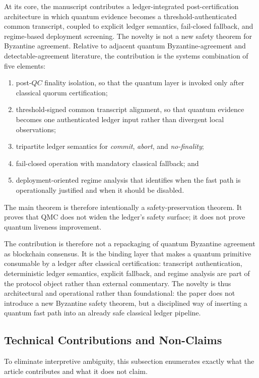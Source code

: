\documentclass{ieeeaccess}
\begin{document}
At its core, the manuscript contributes a ledger-integrated post-certification architecture in which quantum evidence becomes a threshold-authenticated common transcript, coupled to explicit ledger semantics, fail-closed fallback, and regime-based deployment screening. The novelty is not a new safety theorem for Byzantine agreement. Relative to adjacent quantum Byzantine-agreement and detectable-agreement literature, the contribution is the systems combination of five elements:
\begin{enumerate}
    \item post-$QC$ finality isolation, so that the quantum layer is invoked only after classical quorum certification;
    \item threshold-signed common transcript alignment, so that quantum evidence becomes one authenticated ledger input rather than divergent local observations;
    \item tripartite ledger semantics for \textit{commit}, \textit{abort}, and \textit{no-finality};
    \item fail-closed operation with mandatory classical fallback; and
    \item deployment-oriented regime analysis that identifies when the fast path is operationally justified and when it should be disabled.
\end{enumerate}
The main theorem is therefore intentionally a safety-preservation theorem. It proves that QMC does not widen the ledger's safety surface; it does not prove quantum liveness improvement.

The contribution is therefore not a repackaging of quantum Byzantine agreement as blockchain consensus. It is the binding layer that makes a quantum primitive consumable by a ledger after classical certification: transcript authentication, deterministic ledger semantics, explicit fallback, and regime analysis are part of the protocol object rather than external commentary. The novelty is thus architectural and operational rather than foundational: the paper does not introduce a new Byzantine safety theorem, but a disciplined way of inserting a quantum fast path into an already safe classical ledger pipeline.

\subsection{Technical Contributions and Non-Claims}
\label{sec:contributions}
To eliminate interpretive ambiguity, this subsection enumerates exactly what the article contributes and what it does not claim.
\end{document}
